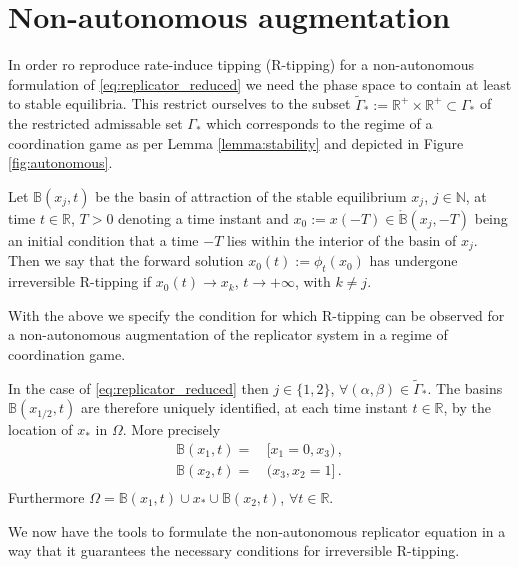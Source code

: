 \documentclass[../main.tex]{subfiles}
\begin{document}
\section{Non-autonomous augmentation}\label{sec:nonautonomous_augmentation}

In order ro reproduce rate-induce tipping (R-tipping) for a non-autonomous formulation of \eqref{eq:replicator_reduced} we need the phase space to contain at least to stable equilibria.
This restrict ourselves to the subset $\tilde{\Gamma}_{*}:=\mathbb{R}^{+}\times \mathbb{R}^{+}\subset\Gamma_{*}$ of the restricted admissable set $\Gamma_{*}$ which corresponds to the regime of a coordination game as per Lemma \ref{lemma:stability} and depicted in Figure \ref{fig:autonomous}.

\begin{definition}\label{def:r_tipping}
        Let $\mathbb{B}(x_{j},t)$ be the basin of attraction of the stable equilibrium $x_{j}$, $j\in\mathbb{N}$, at time $t\in \mathbb{R}$, $T>0$ denoting a time instant and $x_{0} := x(-T) \in \mathring{\mathbb{B}}(x_{j},-T)$ being an initial condition that a time $-T$ lies within the interior of the basin of $x_{j}$. 
        Then we say that the forward solution $x_{0}(t):=\phi_{t}(x_{0})$ has undergone irreversible R-tipping if $x_{0}(t)\to x_{k}$, $t\to+\infty$, with $k\neq j$.
\end{definition}

With the above we specify the condition for which R-tipping can be observed for a non-autonomous augmentation of the replicator system in a regime of coordination game.

\begin{observation}\label{obs:r_tipping_replicator}
        In the case of \eqref{eq:replicator_reduced} then $j\in\{1,2\}$, $\forall(\alpha,\beta)\in\tilde{\Gamma}_{*}$.
        The basins $\mathbb{B}(x_{1/2},t)$ are therefore uniquely identified, at each time instant $t\in \mathbb{R}$, by the location of $x_{*}$ in $\Omega$.
        More precisely
        \begin{align*}
                \mathbb{B}(x_{1},t) =&\, [x_{1}=0,x_{3})\,, \\
                \mathbb{B}(x_{2},t) =&\, (x_{3},x_{2}=1]\,. \\
        \end{align*}
        Furthermore $\Omega = \mathbb{B}(x_{1},t)\cup x_{*} \cup\mathbb{B}(x_{2},t)$, $\forall t\in \mathbb{R}$.
\end{observation}

We now have the tools to formulate the non-autonomous replicator equation in a way that it guarantees the necessary conditions for irreversible R-tipping.



\end{document}
